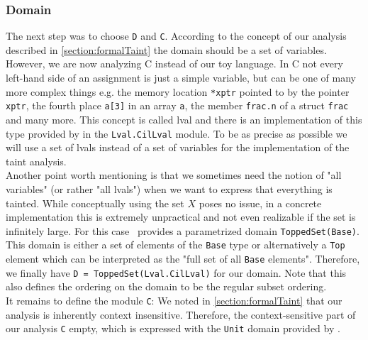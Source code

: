     \subsubsection{Domain}
      The next step was to choose \texttt{D} and \texttt{C}. According to the concept of our analysis described in \autoref{section:formalTaint} the domain should be a set of variables. However, we are now analyzing C instead of our toy language. In C not every left-hand side of an assignment is just a simple variable, but can be one of many more complex things e.g. the memory location \texttt{*xptr} pointed to by the pointer \texttt{xptr}, the fourth place \texttt{a[3]} in an array \texttt{a}, the member \texttt{frac.n} of a struct \texttt{frac} and many more. This concept is called \ac{lval} and there is an implementation of this type provided by \gob in the \texttt{Lval.CilLval} module. To be as precise as possible we will use a set of \ac{lval}s instead of a set of variables for the implementation of the taint analysis.\\
      Another point worth mentioning is that we sometimes need the notion of "all variables" (or rather "all \ac{lval}s") when we want to express that everything is tainted. While conceptually using the set $X$ poses no issue, in a concrete implementation this is extremely unpractical and not even realizable if the set is infinitely large. For this case \gob\ provides a parametrized domain \texttt{ToppedSet(Base)}. This domain is either a set of elements of the \texttt{Base} type or alternatively a \texttt{Top} element which can be interpreted as the "full set of all \texttt{Base} elements". Therefore, we finally have \texttt{D = ToppedSet(Lval.CilLval)} for our domain. Note that this also defines the ordering on the domain to be the regular subset ordering.\\
      It remains to define the module \texttt{C}: We noted in \autoref{section:formalTaint} that our analysis is inherently context insensitive. Therefore, the context-sensitive part of our analysis \texttt{C} empty, which is expressed with the \texttt{Unit} domain provided by \gob.

